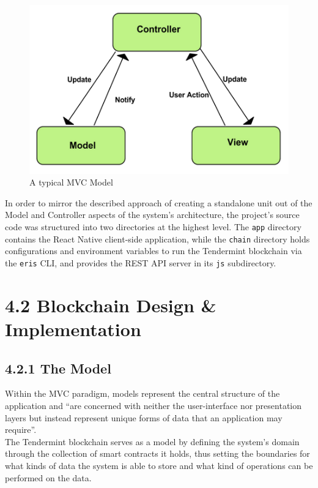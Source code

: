 \begin{figure}[htbp]
\centering
\includegraphics{../diagrams/mvc.png}
\caption{A typical MVC Model\cite{1mvcfigure}}
\end{figure}

In order to mirror the described approach of creating a standalone unit
out of the Model and Controller aspects of the system's architecture,
the project's source code was structured into two directories at the
highest level. The \texttt{app} directory contains the React Native
client-side application, while the \texttt{chain} directory holds
configurations and environment variables to run the Tendermint
blockchain via the \texttt{eris} CLI, and provides the REST API server
in its \texttt{js} subdirectory.

\section{4.2 Blockchain Design \&
Implementation}\label{blockchain-design-implementation}

\subsection{4.2.1 The Model}\label{the-model}

Within the MVC paradigm, models represent the central structure of the
application and ``are concerned with neither the user-interface nor
presentation layers but instead represent unique forms of data that an
application may
require''\cite{osmani2012learning}.\\
The Tendermint blockchain serves as a model by defining the system's
domain through the collection of smart contracts it holds, thus setting
the boundaries for what kinds of data the system is able to store and
what kind of operations can be performed on the data.

